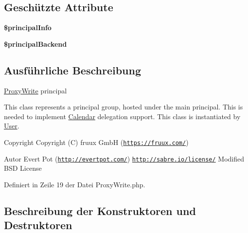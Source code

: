 \subsection*{Geschützte Attribute}
\begin{DoxyCompactItemize}
\item 
\mbox{\label{class_sabre_1_1_cal_d_a_v_1_1_principal_1_1_proxy_write_a0bb5a6facd140f477b24887c6e88adf6}} 
{\bfseries \$principal\+Info}
\item 
\mbox{\label{class_sabre_1_1_cal_d_a_v_1_1_principal_1_1_proxy_write_a27b087d63425bb201e28854c20a8bc17}} 
{\bfseries \$principal\+Backend}
\end{DoxyCompactItemize}


\subsection{Ausführliche Beschreibung}
\mbox{\hyperlink{class_sabre_1_1_cal_d_a_v_1_1_principal_1_1_proxy_write}{Proxy\+Write}} principal

This class represents a principal group, hosted under the main principal. This is needed to implement \textquotesingle{}\mbox{\hyperlink{class_sabre_1_1_cal_d_a_v_1_1_calendar}{Calendar}} delegation\textquotesingle{} support. This class is instantiated by \mbox{\hyperlink{class_sabre_1_1_cal_d_a_v_1_1_principal_1_1_user}{User}}.

\begin{DoxyCopyright}{Copyright}
Copyright (C) fruux GmbH (\href{https://fruux.com/}{\tt https\+://fruux.\+com/}) 
\end{DoxyCopyright}
\begin{DoxyAuthor}{Autor}
Evert Pot (\href{http://evertpot.com/}{\tt http\+://evertpot.\+com/})  \href{http://sabre.io/license/}{\tt http\+://sabre.\+io/license/} Modified B\+SD License 
\end{DoxyAuthor}


Definiert in Zeile 19 der Datei Proxy\+Write.\+php.



\subsection{Beschreibung der Konstruktoren und Destruktoren}
\mbox{\label{class_sabre_1_1_cal_d_a_v_1_1_principal_1_1_proxy_write_af4d011aae815d8adcc32fff3d15c6660}} 
